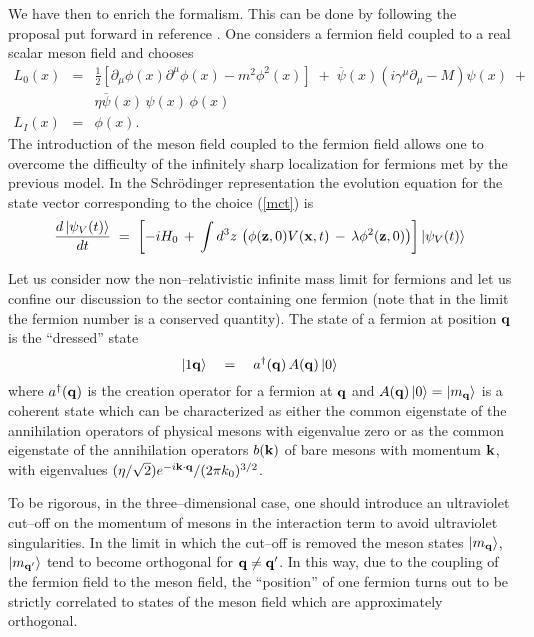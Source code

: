 \documentclass[10pt,a4paper]{article}
\begin{document}
We have then to enrich the formalism. This can be done by
following the proposal put forward in reference \cite{p62}. One
considers a fermion field coupled to a real scalar meson field and
chooses
\begin{eqnarray} \label{mct}
L_{0}(x) & = & \frac{1}{2}\left[ \partial_{\mu}\phi(x)
\partial^{\mu}\phi(x) - m^{2}\phi^{2}(x)\right] \; + \;
\overline{\psi}(x)\left( i\gamma^{\mu}\partial_{\mu} -
M\right)\psi(x) \; +
\nonumber \\
& &
\eta \overline{\psi}(x)\,\psi(x)\,\phi(x) \nonumber \\
L_{I}(x) & = & \phi(x).
\end{eqnarray}
The introduction of the meson field coupled to the fermion field
allows one to overcome the difficulty of the infinitely sharp
localization for fermions met by the previous model. In the
Schr\"odinger representation the evolution equation for the state
vector corresponding to the choice (\ref{mct}) is
\begin{equation} \label{mtre}
\frac{d\,|\psi_{V}(t)\rangle}{dt}\; = \; \left[ -i H_{0}\, + \,
\int d^{3}z\, \left( \phi({\bf z}, 0) V({\bf x}, t) \, - \,
\lambda \phi^{2}({\bf z}, 0) \right)\right] |\psi_{V}(t)\rangle
\end{equation}

Let us consider now the non--relativistic infinite mass limit for
fermions and let us confine our discussion to the sector
containing one fermion (note that in the limit the fermion number
is a conserved quantity). The state of a fermion at position ${\bf
q}$ is the ``dressed'' state
\begin{equation}
|1{\bf q}\rangle \quad = \quad a^{\dagger}({\bf q})\, A({\bf q})\,
|0\rangle
\end{equation}
where $a^{\dagger}({\bf q})$ is the creation operator for a
fermion at ${\bf q}$ and $A({\bf q})\, |0\rangle = |m_{\bf
q}\rangle$ is a coherent state which can be characterized as
either the common eigenstate of the annihilation operators of
physical mesons with eigenvalue zero or as the common eigenstate
of the annihilation operators $b({\bf k})$ of bare mesons with
momentum ${\bf k}$, with eigenvalues $(\eta/\sqrt{2})e^{-i{\bf
k}\cdot {\bf q}}/(2\pi k_{0})^{3/2}$.

To be rigorous, in the three--dimensional case, one should
introduce an ultraviolet cut--off on the momentum of mesons in the
interaction term to avoid ultraviolet singularities. In the limit
in which the cut--off is removed the meson states $|m_{\bf
q}\rangle$, $|m_{{\bf q}'}\rangle$ tend to become orthogonal for
${\bf q} \neq {\bf q}'$. In this way, due to the coupling of the
fermion field to the meson field, the ``position'' of one fermion
turns out to be strictly correlated to states of the meson field
which are approximately orthogonal.
\end{document}
